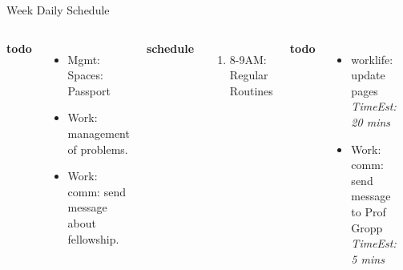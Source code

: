 \documentclass[serif, mathserif, final]{beamer}
\newcommand{\te}[1]{\textit{TimeEst:} \textit{#1}}
\begin{document}
\begin{frame}{}
\begin{columns}
\begin{column}{0.50\linewidth}
      \begin{block}{Week Daily Schedule}
        \begin{columns} 
          \textbf{\small todo} \\ 
          \begin{itemize}
            \tiny \item \tiny Mgmt: Spaces: Passport
          \item \tiny Work: management of problems.
          \item \tiny Work: comm: send message about fellowship.
          \end{itemize} 
          \textbf{\small schedule} \\
          \begin{enumerate} 
            \tiny \item \tiny 8-9AM: Regular Routines 
          \end{enumerate} 
          
          \textbf{\small todo} \\
  \begin{itemize}
    \tiny \item \tiny worklife: update pages \te{20 mins}
    \item \tiny Work: comm: send message to Prof Gropp \te{5 mins} 
  \end{itemize}  
  \textbf{\small schedule}\\ 
  \begin{enumerate} 
    \tiny \item \tiny 8-9AM: Regular Routines 
  \end{enumerate} 

  \textbf{\small todo} \\
  \begin{itemize}
\tiny \item \tiny 

  \end{itemize}
  \textbf{\small schedule} \\
  \begin{enumerate}
    \tiny \item \tiny 8-9AM: Regular Routines 
  \end{enumerate}
  
  \textbf{\small todo}\\
  \begin{itemize} 


\end{itemize}
\end{columns}
\end{block}
\end{column}
\end{columns}
\end{frame}
\end{document}
